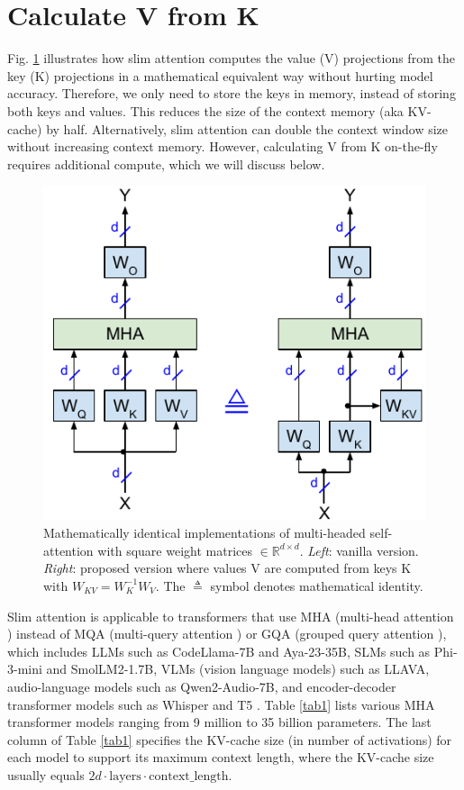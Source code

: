 \documentclass{article}
\newcommand{\eR}[2]{$\in \mathbb{R}^{#1 \times #2}$} %
\begin{document}
\section{Calculate V from K}
Fig. \ref{fig1} illustrates how slim attention computes the value (V) projections from the key (K) projections in a mathematical equivalent way without hurting model accuracy. Therefore, we only need to store the keys in memory, instead of storing both keys and values. This reduces the size of the context memory (aka KV-cache) by half. Alternatively, slim attention can double the context window size without increasing context memory. However, calculating V from K on-the-fly requires additional compute, which we will discuss below.
\begin{figure}[h!] \centering  %
  \includegraphics[scale=0.81]{../doc/fig/slimAttn_fig1.pdf}
  \caption{Mathematically identical implementations of multi-headed self-attention with square weight matrices \eR{d}{d}. \emph{Left}: vanilla version. \emph{Right}: proposed version where values V are computed from keys K with $W_{KV} = W_K^{-1} W_V$. The $\triangleq$ symbol denotes mathematical identity.}
\label{fig1} \end{figure}

Slim attention is applicable to transformers that use MHA (multi-head attention \citep{vanilla}) instead of MQA (multi-query attention \citep{MQA}) or GQA (grouped query attention \citep{GQA}), which includes LLMs such as CodeLlama-7B and Aya-23-35B, SLMs such as Phi-3-mini and SmolLM2-1.7B, VLMs (vision language models) such as LLAVA, audio-language models such as Qwen2-Audio-7B, and encoder-decoder transformer models such as Whisper \citep{whisper} and T5 \citep{T5}. Table \ref{tab1} lists various MHA transformer models ranging from 9 million to 35 billion parameters. The last column of Table \ref{tab1} specifies the KV-cache size (in number of activations) for each model to support its maximum context length, where the KV-cache size usually equals $2 d \cdot \text{layers} \cdot \text{context\_length}$.
\end{document}
